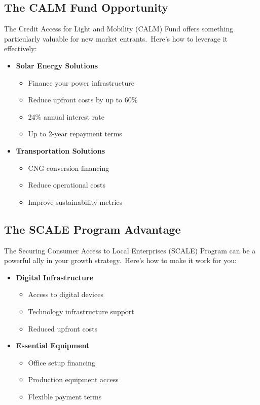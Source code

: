 \subsection{The CALM Fund Opportunity}\label{subsec:calm-fund}

The Credit Access for Light and Mobility (CALM) Fund offers something particularly valuable for new market entrants.\ Here's how to leverage it effectively:

\begin{itemize}
    \item \textbf{Solar Energy Solutions}
    \begin{itemize}
        \item Finance your power infrastructure
        \item Reduce upfront costs by up to 60\%
        \item 24\% annual interest rate
        \item Up to 2-year repayment terms
    \end{itemize}

    \item \textbf{Transportation Solutions}
    \begin{itemize}
        \item CNG conversion financing
        \item Reduce operational costs
        \item Improve sustainability metrics
    \end{itemize}
\end{itemize}

\subsection{The SCALE Program Advantage}\label{subsec:scale-program}

The Securing Consumer Access to Local Enterprises (SCALE) Program can be a powerful ally in your growth strategy.\ Here's how to make it work for you:

\begin{itemize}
    \item \textbf{Digital Infrastructure}
    \begin{itemize}
        \item Access to digital devices
        \item Technology infrastructure support
        \item Reduced upfront costs
    \end{itemize}

    \item \textbf{Essential Equipment}
    \begin{itemize}
        \item Office setup financing
        \item Production equipment access
        \item Flexible payment terms
    \end{itemize}
\end{itemize}

